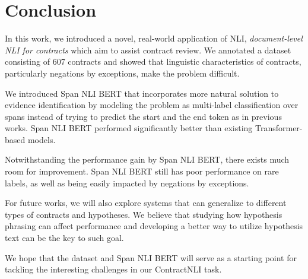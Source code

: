 \section{Conclusion}

In this work, we introduced a novel, real-world application of NLI, \emph{document-level NLI for contracts} which aim to assist contract review.
We annotated a dataset consisting of 607 contracts and showed that linguistic characteristics of contracts, particularly negations by exceptions, make the problem difficult.

We introduced Span NLI BERT that incorporates more natural solution to evidence identification by modeling the problem as multi-label classification over spans instead of trying to predict the start and the end token as in previous works.
Span NLI BERT performed significantly better than existing Transformer-based models.

Notwithstanding the performance gain by Span NLI BERT, there exists much room for improvement.
Span NLI BERT still has poor performance on rare labels, as well as being easily impacted by negations by exceptions.

For future works, we will also explore systems that can generalize to different types of contracts and hypotheses.
We believe that studying how hypothesis phrasing can affect performance and developing a better way to utilize hypothesis text can be the key to such goal.

We hope that the dataset and Span NLI BERT will serve as a starting point for tackling the interesting challenges in our ContractNLI task.

